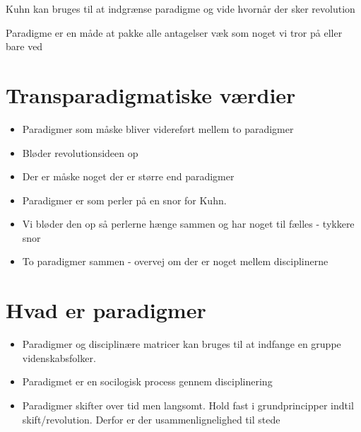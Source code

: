 \documentclass[11pt]{article}
\begin{document}
Kuhn kan bruges til at indgrænse paradigme og vide hvornår der sker revolution

Paradigme er en måde at pakke alle antagelser væk som noget vi tror på eller
bare ved

\section{Transparadigmatiske værdier}
\label{sec:orge52a02d}
\begin{itemize}
\item Paradigmer som måske bliver videreført mellem to paradigmer
\item Bløder revolutionsideen op
\item Der er måske noget der er større end paradigmer
\item Paradigmer er som perler på en snor for Kuhn.
\item Vi bløder den op så perlerne hænge sammen og har noget til fælles - tykkere snor
\item To paradigmer sammen - overvej om der er noget mellem disciplinerne
\end{itemize}

\section{Hvad er paradigmer}
\label{sec:orgd237424}
\begin{itemize}
\item Paradigmer og disciplinære matricer kan bruges til at indfange en gruppe videnskabsfolker.
\item Paradigmet er en socilogisk process gennem disciplinering
\item Paradigmer skifter over tid men langsomt. Hold fast i grundprincipper indtil
skift/revolution. Derfor er der usammenlignelighed til stede
\end{itemize}
\end{document}
